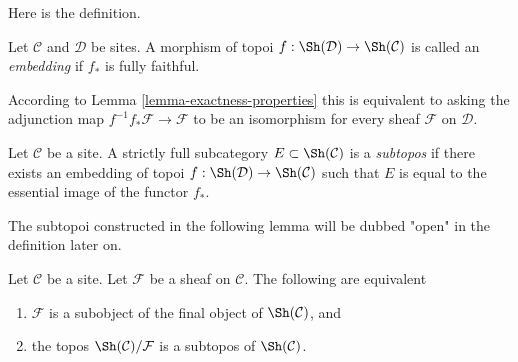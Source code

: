 \noindent
Here is the definition.

\begin{definition}
\label{definition-embedding}
Let $\mathcal{C}$ and $\mathcal{D}$ be sites.
A morphism of topoi $f : \Sh(\mathcal{D}) \to \Sh(\mathcal{C})$
is called an {\it embedding} if $f_*$ is fully faithful.
\end{definition}

\noindent
According to Lemma \ref{lemma-exactness-properties}
this is equivalent to asking the
adjunction map $f^{-1}f_*\mathcal{F} \to \mathcal{F}$
to be an isomorphism for every sheaf $\mathcal{F}$ on $\mathcal{D}$.

\begin{definition}
\label{definition-subtopos}
Let $\mathcal{C}$ be a site. A strictly full subcategory
$E \subset \Sh(\mathcal{C})$ is a {\it subtopos} if there
exists an embedding of topoi $f : \Sh(\mathcal{D}) \to \Sh(\mathcal{C})$
such that $E$ is equal to the essential image of the functor $f_*$.
\end{definition}

\noindent
The subtopoi constructed in the following lemma will be dubbed
"open" in the definition later on.

\begin{lemma}
\label{lemma-open-subtopos}
Let $\mathcal{C}$ be a site. Let $\mathcal{F}$ be a sheaf on
$\mathcal{C}$. The following are equivalent
\begin{enumerate}
\item $\mathcal{F}$ is a subobject of the final object of
$\Sh(\mathcal{C})$, and
\item the topos $\Sh(\mathcal{C})/\mathcal{F}$ is a subtopos of
$\Sh(\mathcal{C})$.
\end{enumerate}
\end{lemma}

